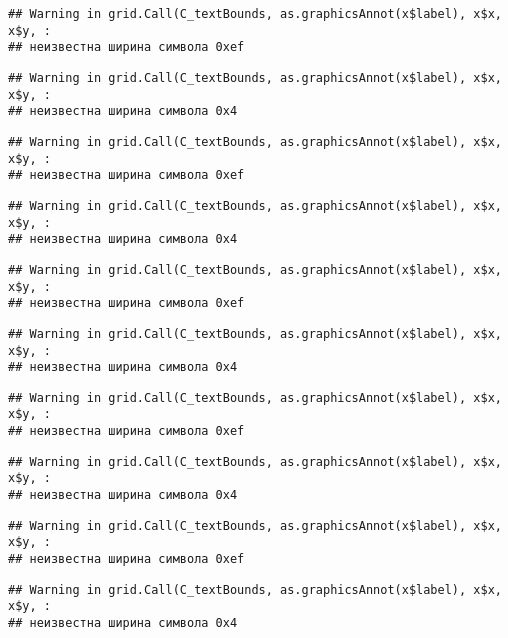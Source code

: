 \documentclass[
]{article}
\begin{document}
\begin{verbatim}
## Warning in grid.Call(C_textBounds, as.graphicsAnnot(x$label), x$x, x$y, :
## неизвестна ширина символа 0xef
\end{verbatim}

\begin{verbatim}
## Warning in grid.Call(C_textBounds, as.graphicsAnnot(x$label), x$x, x$y, :
## неизвестна ширина символа 0x4
\end{verbatim}

\begin{verbatim}
## Warning in grid.Call(C_textBounds, as.graphicsAnnot(x$label), x$x, x$y, :
## неизвестна ширина символа 0xef
\end{verbatim}

\begin{verbatim}
## Warning in grid.Call(C_textBounds, as.graphicsAnnot(x$label), x$x, x$y, :
## неизвестна ширина символа 0x4
\end{verbatim}

\begin{verbatim}
## Warning in grid.Call(C_textBounds, as.graphicsAnnot(x$label), x$x, x$y, :
## неизвестна ширина символа 0xef
\end{verbatim}

\begin{verbatim}
## Warning in grid.Call(C_textBounds, as.graphicsAnnot(x$label), x$x, x$y, :
## неизвестна ширина символа 0x4
\end{verbatim}

\begin{verbatim}
## Warning in grid.Call(C_textBounds, as.graphicsAnnot(x$label), x$x, x$y, :
## неизвестна ширина символа 0xef
\end{verbatim}

\begin{verbatim}
## Warning in grid.Call(C_textBounds, as.graphicsAnnot(x$label), x$x, x$y, :
## неизвестна ширина символа 0x4
\end{verbatim}

\begin{verbatim}
## Warning in grid.Call(C_textBounds, as.graphicsAnnot(x$label), x$x, x$y, :
## неизвестна ширина символа 0xef
\end{verbatim}

\begin{verbatim}
## Warning in grid.Call(C_textBounds, as.graphicsAnnot(x$label), x$x, x$y, :
## неизвестна ширина символа 0x4
\end{verbatim}
\end{document}
